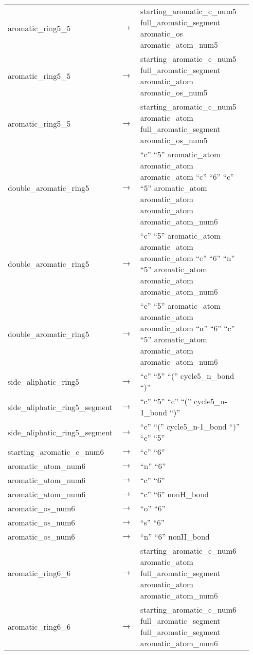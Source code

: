 \documentclass[../Document.tex]{subfiles}
\begin{document}
\begin{longtable}{m{} p{} p{}}
    aromatic\_ring5\_5 & $\rightarrow$ & starting\_aromatic\_c\_num5 full\_aromatic\_segment aromatic\_os aromatic\_atom\_num5 \\
    aromatic\_ring5\_5 & $\rightarrow$ & starting\_aromatic\_c\_num5 full\_aromatic\_segment aromatic\_atom aromatic\_os\_num5 \\
    aromatic\_ring5\_5 & $\rightarrow$ & starting\_aromatic\_c\_num5 aromatic\_atom full\_aromatic\_segment aromatic\_os\_num5 \\
    double\_aromatic\_ring5 & $\rightarrow$ & ``c'' ``5'' aromatic\_atom aromatic\_atom aromatic\_atom ``c'' ``6'' ``c'' ``5'' aromatic\_atom aromatic\_atom aromatic\_atom aromatic\_atom\_num6 \\
    double\_aromatic\_ring5 & $\rightarrow$ & ``c'' ``5'' aromatic\_atom aromatic\_atom aromatic\_atom ``c'' ``6'' ``n'' ``5'' aromatic\_atom aromatic\_atom aromatic\_atom\_num6 \\
    double\_aromatic\_ring5 & $\rightarrow$ & ``c'' ``5'' aromatic\_atom aromatic\_atom aromatic\_atom ``n'' ``6'' ``c'' ``5'' aromatic\_atom aromatic\_atom aromatic\_atom\_num6 \\
    side\_aliphatic\_ring5 & $\rightarrow$ & ``c'' ``5'' ``('' cycle5\_n\_bond ``)'' \\
    side\_aliphatic\_ring5\_segment & $\rightarrow$ & ``c'' ``5'' ``c'' ``('' cycle5\_n-1\_bond ``)'' \\
    side\_aliphatic\_ring5\_segment & $\rightarrow$ & ``c'' ``('' cycle5\_n-1\_bond ``)'' ``c'' ``5'' \\
    starting\_aromatic\_c\_num6 & $\rightarrow$ & ``c'' ``6'' \\
    aromatic\_atom\_num6 & $\rightarrow$ & ``n'' ``6'' \\
    aromatic\_atom\_num6 & $\rightarrow$ & ``c'' ``6'' \\
    aromatic\_atom\_num6 & $\rightarrow$ & ``c'' ``6'' nonH\_bond \\
    aromatic\_os\_num6 & $\rightarrow$ & ``o'' ``6'' \\
    aromatic\_os\_num6 & $\rightarrow$ & ``s'' ``6'' \\
    aromatic\_os\_num6 & $\rightarrow$ & ``n'' ``6'' nonH\_bond \\
    aromatic\_ring6\_6 & $\rightarrow$ & starting\_aromatic\_c\_num6 aromatic\_atom full\_aromatic\_segment aromatic\_atom aromatic\_atom\_num6 \\
    aromatic\_ring6\_6 & $\rightarrow$ & starting\_aromatic\_c\_num6 full\_aromatic\_segment full\_aromatic\_segment aromatic\_atom\_num6 \\

\end{longtable}
\end{document}
